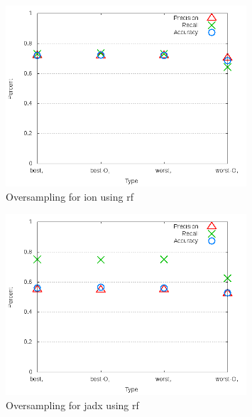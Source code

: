 \clearpage
\begin{figure}[!t]
\centering
\includegraphics[width=0.8\textwidth]{images/rf/test_4/ion_sample_range.png}
\caption{Oversampling for ion using \gls{rf}}
\label{fig:test_4_ion_rf}
\end{figure}

\begin{figure}[!t]
\centering
\includegraphics[width=0.8\textwidth]{images/rf/test_4/jadx_sample_range.png}
\caption{Oversampling for jadx using \gls{rf}}
\label{fig:test_4_jadx_rf}
\end{figure}

